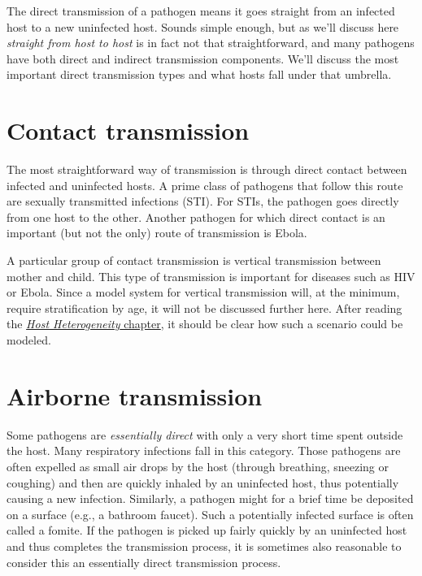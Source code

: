 \documentclass[]{book}
\theoremstyle{definition}
\theoremstyle{definition}
\theoremstyle{definition}
\theoremstyle{remark}
\begin{document}
The direct transmission of a pathogen means it goes straight from an
infected host to a new uninfected host. Sounds simple enough, but as
we'll discuss here \emph{straight from host to host} is in fact not that
straightforward, and many pathogens have both direct and indirect
transmission components. We'll discuss the most important direct
transmission types and what hosts fall under that umbrella.

\section{Contact transmission}\label{contact-transmission}

The most straightforward way of transmission is through direct contact
between infected and uninfected hosts. A prime class of pathogens that
follow this route are sexually transmitted infections (STI). For STIs,
the pathogen goes directly from one host to the other. Another pathogen
for which direct contact is an important (but not the only) route of
transmission is Ebola.

A particular group of contact transmission is vertical transmission
between mother and child. This type of transmission is important for
diseases such as HIV or Ebola. Since a model system for vertical
transmission will, at the minimum, require stratification by age, it
will not be discussed further here. After reading the \href{}{\emph{Host
Heterogeneity} chapter}, it should be clear how such a scenario could be
modeled.

\section{Airborne transmission}\label{airborne-transmission}

Some pathogens are \emph{essentially direct} with only a very short time
spent outside the host. Many respiratory infections fall in this
category. Those pathogens are often expelled as small air drops by the
host (through breathing, sneezing or coughing) and then are quickly
inhaled by an uninfected host, thus potentially causing a new infection.
Similarly, a pathogen might for a brief time be deposited on a surface
(e.g., a bathroom faucet). Such a potentially infected surface is often
called a fomite. If the pathogen is picked up fairly quickly by an
uninfected host and thus completes the transmission process, it is
sometimes also reasonable to consider this an essentially direct
transmission process.
\end{document}
